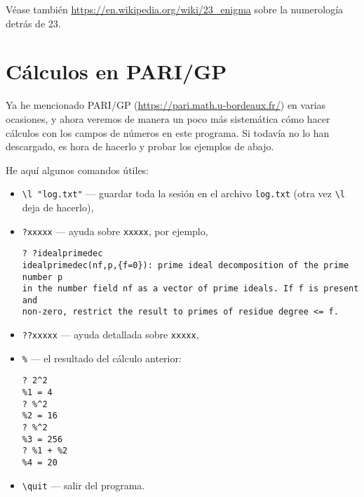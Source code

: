 Véase también \url{https://en.wikipedia.org/wiki/23_enigma}
sobre la numerología detrás de 23.


\pagebreak
\section{Cálculos en PARI/GP}

Ya he mencionado PARI/GP (\url{https://pari.math.u-bordeaux.fr/}) en varias
ocasiones, y ahora veremos de manera un poco más sistemática cómo hacer cálculos
con los campos de números en este programa. Si todavía no lo han descargado, es
hora de hacerlo y probar los ejemplos de abajo.

\vspace{1em}

He aquí algunos comandos útiles:
\begin{itemize}
\item \texttt{\textbackslash{}l "log.txt"} --- guardar toda la sesión en el archivo \texttt{log.txt} (otra vez \texttt{\textbackslash{}l} deja de hacerlo),

\item \texttt{?xxxxx} --- ayuda sobre \texttt{xxxxx}, por ejemplo,

\begin{shaded}
\begin{verbatim}
? ?idealprimedec
idealprimedec(nf,p,{f=0}): prime ideal decomposition of the prime number p
in the number field nf as a vector of prime ideals. If f is present and
non-zero, restrict the result to primes of residue degree <= f.
\end{verbatim}
\end{shaded}

\item \texttt{??xxxxx} --- ayuda detallada sobre \texttt{xxxxx},

\item \texttt{\%} --- el resultado del cálculo anterior:
  
\begin{shaded}
\begin{verbatim}
? 2^2
%1 = 4
? %^2
%2 = 16
? %^2
%3 = 256
? %1 + %2
%4 = 20
\end{verbatim}
\end{shaded}

\item \texttt{\textbackslash{}quit} --- salir del programa.
\end{itemize}

